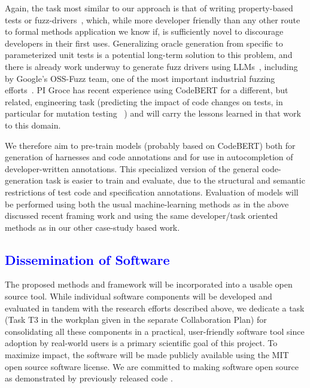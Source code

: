 Again, the task most similar to our approach is that of
writing property-based tests or fuzz-drivers~\cite{goldstein2022some},
which, while more developer friendly than any other route to formal
methods application we know if, is sufficiently novel to discourage
developers in their first uses.  Generalizing oracle
generation from specific to parameterized unit tests is a potential
long-term solution to this problem, and there is already work underway
to generate fuzz drivers using LLMs~\cite{zhang2023understanding},
including by Google's OSS-Fuzz team, one of the most important
industrial fuzzing efforts~\cite{ossfuzzllm}.  PI Groce has recent experience
using CodeBERT for a different, but related, engineering task
(predicting the impact of code changes on tests, in particular for
mutation testing ~\cite{ContextPMT}) and will carry the lessons learned in that work to
this domain.

We therefore aim to pre-train models (probably based on CodeBERT) both
for generation of harnesses and code annotations and for use in
autocompletion of developer-written annotations.  This specialized
version of the general code-generation task is easier to train and
evaluate, due to the structural and semantic restrictions of test code
and specification annotations.  Evaluation of models will be performed
using both the usual machine-learning methods as in the above
discussed recent framing work and using the same
developer/task oriented methods as in our other case-study based work.

\subsection{\textcolor{blue}{Dissemination of Software}}
\label{sec:software}

The proposed methods and framework will be incorporated into a usable
open source tool.
While individual software components will be developed and evaluated
in tandem with the research efforts described above, we dedicate a
task (Task T3 in the workplan given in the separate Collaboration Plan) for consolidating all
these components in a practical, user-friendly software tool since
adoption by real-world users is a primary scientific goal of this project.
To maximize impact, the software will be made publicly available %
using the MIT open source software license.
We are committed to making software open source as demonstrated by previously released %
code \cite{mleplussoftware, bernalMLEToolIntegrated2012a, openbuildnetsoftware, nghiemOpenBuildNetFrameworkDistributed2016}.


